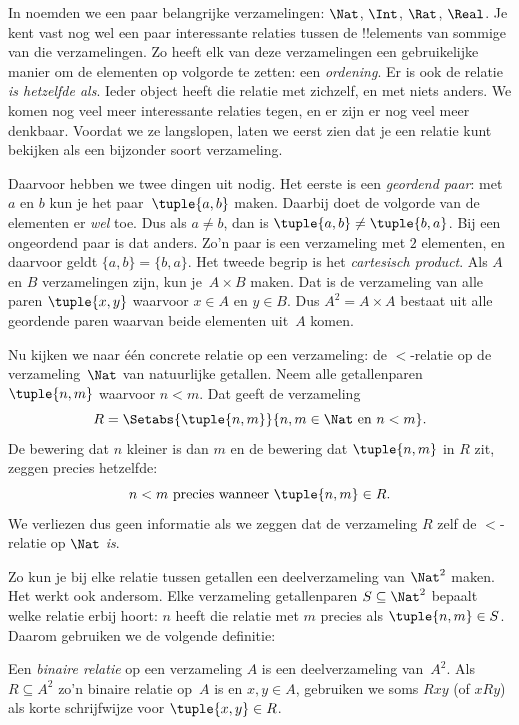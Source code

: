 \documentclass[openany]{memoir}
\begin{document}
\begin{explain}
In  noemden we een paar belangrijke
verzamelingen: $\Nat$, $\Int$, $\Rat$, $\Real$. Je kent vast nog wel
een paar interessante relaties tussen de !!{element}s van sommige van
die verzamelingen. Zo heeft elk van deze verzamelingen een gebruikelijke
manier om de elementen op volgorde te zetten: een \emph{ordening}. Er
is ook de relatie \emph{is hetzelfde als}. Ieder
object heeft die relatie met zichzelf, en met niets anders. We komen
nog veel meer interessante relaties tegen, en er zijn er nog veel meer
denkbaar. Voordat we ze langslopen, laten we eerst zien dat je een
relatie kunt bekijken als een bijzonder soort verzameling.
  
Daarvoor hebben we twee dingen uit  nodig.
Het eerste is een \emph{geordend paar}: met $a$ en $b$ kun je
het paar~$\tuple{a, b}$ maken. Daarbij doet de volgorde van de elementen
er \emph{wel} toe. Dus als $a \neq b$, dan is $\tuple{a, b} \neq
\tuple{b, a}$. Bij een ongeordend paar is dat anders. Zo'n paar is een
verzameling met $2$ elementen, en daarvoor geldt $\{a, b\}=\{b, a\}$.
Het tweede begrip is het \emph{cartesisch product}. Als $A$ en $B$
verzamelingen zijn, kun je~$A \times B$ maken. Dat is de verzameling
van alle paren $\tuple{x, y}$ waarvoor $x \in A$ en $y \in B$. Dus
$A^{2}= A \times A$ bestaat uit alle geordende paren waarvan beide
elementen uit~$A$ komen.
  
Nu kijken we naar één concrete relatie op een verzameling: de
$<$-relatie op de verzameling~$\Nat$ van natuurlijke getallen. Neem
alle getallenparen $\tuple{n, m}$ waarvoor $n<m$. Dat geeft de
verzameling
\[
  R=\Setabs{\tuple{n, m}}{n, m \in \Nat \text{ en } n<m}.
\]
De bewering dat $n$ kleiner is dan $m$ en de bewering dat
$\tuple{n, m}$ in $R$ zit, zeggen precies hetzelfde:
\[
      n<m\text{ precies wanneer }\tuple{n, m} \in R.
\]
We verliezen dus geen informatie als we zeggen dat de verzameling $R$
zelf de $<$-relatie op $\Nat$ \emph{is}.

Zo kun je bij elke relatie tussen getallen een deelverzameling van
$\Nat^{2}$ maken. Het werkt ook andersom. Elke verzameling
getallenparen $S \subseteq \Nat^{2}$ bepaalt welke relatie erbij
hoort: $n$ heeft die relatie met $m$ precies als $\tuple{n, m} \in S$.
Daarom gebruiken we de volgende definitie:
\end{explain}
  
\begin{defn}
Een \emph{binaire relatie} op een verzameling $A$ is een
deelverzameling van~$A^{2}$. Als $R \subseteq A^{2}$ zo'n binaire
relatie op~$A$ is en $x, y \in A$, gebruiken we soms $Rxy$ (of $xRy$)
als korte schrijfwijze voor $\tuple{x, y} \in R$.
\end{defn}
  
\end{document}
